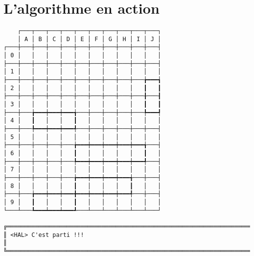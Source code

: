 \chapter{L'algorithme en action}
{\scriptsize
\begin{verbatim}
    ┌───┬───┬───┬───┬───┬───┬───┬───┬───┬───┐
    │ A │ B │ C │ D │ E │ F │ G │ H │ I │ J │
┌───┼───┼───┼───┼───┼───┼───┼───┼───┼───┼───┤
│ 0 │   │   │   │   │   │   │   │   │   │   │
├───┼───┼───┼───┼───┼───┼───┼───┼───┼───┼───┤
│ 1 │   │   │   │   │   │   │   │   │   │   │
├───┼───┼───┼───┼───┼───┼───┼───┼───┼───╆━━━┪
│ 2 │   │   │   │   │   │   │   │   │   ┃   ┃
├───┼───┼───┼───┼───┼───┼───┼───┼───┼───╂───┨
│ 3 │   │   │   │   │   │   │   │   │   ┃   ┃
├───┼───╆━━━┿━━━┿━━━╅───┼───┼───┼───┼───╄━━━┩
│ 4 │   ┃   │   │   ┃   │   │   │   │   │   │
├───┼───╄━━━┿━━━┿━━━╃───┼───┼───┼───┼───┼───┤
│ 5 │   │   │   │   │   │   │   │   │   │   │
├───┼───┼───┼───┼───╆━━━┿━━━┿━━━┿━━━┿━━━╅───┤
│ 6 │   │   │   │   ┃   │   │   │   │   ┃   │
├───┼───┼───┼───┼───╄━━━┿━━━┿━━━┿━━━┿━━━╃───┤
│ 7 │   │   │   │   │   │   │   │   │   │   │
├───┼───┼───┼───┼───╆━━━┿━━━┿━━━┿━━━╅───┼───┤
│ 8 │   │   │   │   ┃   │   │   │   ┃   │   │
├───┼───╆━━━┿━━━┿━━━╋━━━┿━━━┿━━━┿━━━╃───┼───┤
│ 9 │   ┃   │   │   ┃   │   │   │   │   │   │
└───┴───┺━━━┷━━━┷━━━┹───┴───┴───┴───┴───┴───┘

╔══════════════════════════════════════════════════════════════════════════════════════════════════╗
║ <HAL> C'est parti !!!                                                                            ║
╚══════════════════════════════════════════════════════════════════════════════════════════════════╝
\end{verbatim}}
\newpage

